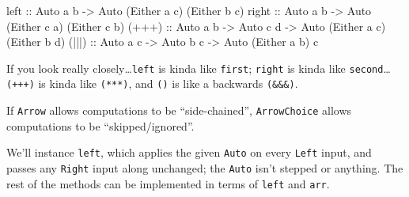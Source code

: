 \documentclass[]{article}
\newenvironment{Shaded}{}{}
\newcommand{\CommentTok}[1]{\textcolor[rgb]{0.38,0.63,0.69}{\textit{#1}}}
\newcommand{\DataTypeTok}[1]{\textcolor[rgb]{0.56,0.13,0.00}{#1}}
\newcommand{\FunctionTok}[1]{\textcolor[rgb]{0.02,0.16,0.49}{#1}}
\newcommand{\KeywordTok}[1]{\textcolor[rgb]{0.00,0.44,0.13}{\textbf{#1}}}
\newcommand{\NormalTok}[1]{#1}
\newcommand{\OtherTok}[1]{\textcolor[rgb]{0.00,0.44,0.13}{#1}}
\begin{document}
\begin{Shaded}
\begin{Highlighting}[]
\OtherTok{left  ::} \DataTypeTok{Auto}\NormalTok{ a b }\OtherTok{->} \DataTypeTok{Auto}\NormalTok{ (}\DataTypeTok{Either}\NormalTok{ a c) (}\DataTypeTok{Either}\NormalTok{ b c)}
\OtherTok{right ::} \DataTypeTok{Auto}\NormalTok{ a b }\OtherTok{->} \DataTypeTok{Auto}\NormalTok{ (}\DataTypeTok{Either}\NormalTok{ c a) (}\DataTypeTok{Either}\NormalTok{ c b)}
\OtherTok{(+++) ::} \DataTypeTok{Auto}\NormalTok{ a b }\OtherTok{->} \DataTypeTok{Auto}\NormalTok{ c d }\OtherTok{->} \DataTypeTok{Auto}\NormalTok{ (}\DataTypeTok{Either}\NormalTok{ a c) (}\DataTypeTok{Either}\NormalTok{ b d)}
\OtherTok{(|||) ::} \DataTypeTok{Auto}\NormalTok{ a c }\OtherTok{->} \DataTypeTok{Auto}\NormalTok{ b c }\OtherTok{->} \DataTypeTok{Auto}\NormalTok{ (}\DataTypeTok{Either}\NormalTok{ a b) c}
\end{Highlighting}
\end{Shaded}

If you look really closely\ldots{}\texttt{left} is kinda like \texttt{first};
\texttt{right} is kinda like \texttt{second}\ldots{}\texttt{(+++)} is kinda like
\texttt{(***)}, and \texttt{(\textbar{}\textbar{}\textbar{})} is like a
backwards \texttt{(\&\&\&)}.

If \texttt{Arrow} allows computations to be ``side-chained'',
\texttt{ArrowChoice} allows computations to be ``skipped/ignored''.

We'll instance \texttt{left}, which applies the given \texttt{Auto} on every
\texttt{Left} input, and passes any \texttt{Right} input along unchanged; the
\texttt{Auto} isn't stepped or anything. The rest of the methods can be
implemented in terms of \texttt{left} and \texttt{arr}.

\begin{Shaded}
\end{Shaded}
\end{document}
